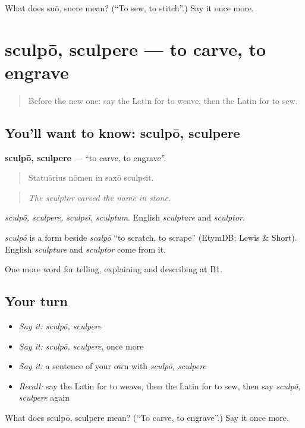 \begin{tcolorbox}[breakable,colback=teal!4,colframe=teal!35!black,title={Before you move on}]
What does suō, suere mean? (\textquotedblleft{}To sew, to stitch\textquotedblright{}.) Say it once more.
\end{tcolorbox}
\section[sculpō, sculpere]{sculpō, sculpere — to carve, to engrave}

\label{lesson:LA-C378-sculpo}



\begin{quote}
Before the new one: say the Latin for to weave, then the Latin for to sew.
\end{quote}

\subsection*{You'll want to know: sculpō, sculpere}
\textbf{sculpō, sculpere} — \textquotedblleft{}to carve, to engrave\textquotedblright{}.

\begin{quote}
Statuārius nōmen in saxō sculpsit.
\end{quote}

\begin{quote}
\emph{The sculptor carved the name in stone.}
\end{quote}

\emph{sculpō, sculpere, sculpsī, sculptum}. English \emph{sculpture} and \emph{sculptor}.

\begin{cousinweb}
\emph{sculpō} is a form beside \emph{scalpō} \textquotedblleft{}to scratch, to scrape\textquotedblright{} (EtymDB; Lewis \& Short). English \emph{sculpture} and \emph{sculptor} come from it.
\end{cousinweb}

\begin{grammarlens}[title={What you've built}]
One more word for telling, explaining and describing at B1.
\end{grammarlens}

\subsection*{Your turn}
\begin{itemize}
\raggedright
  \item \emph{Say it:} \emph{sculpō, sculpere}
  \item \emph{Say it:} \emph{sculpō, sculpere}, once more
  \item \emph{Say it:} a sentence of your own with \emph{sculpō, sculpere}
  \item \emph{Recall:} say the Latin for to weave, then the Latin for to sew, then say \emph{sculpō, sculpere} again
\end{itemize}

\begin{tcolorbox}[breakable,colback=teal!4,colframe=teal!35!black,title={Before you move on}]
What does sculpō, sculpere mean? (\textquotedblleft{}To carve, to engrave\textquotedblright{}.) Say it once more.
\end{tcolorbox}
